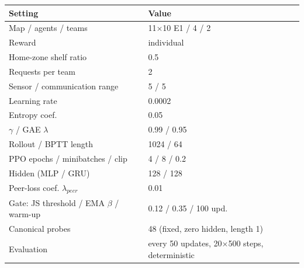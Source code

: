 \begin{tabular}{ll}
\toprule
Setting & Value \\
\midrule
Map / agents / teams & 11$\times$10 E1 / 4 / 2 \\
Reward & individual \\
Home-zone shelf ratio & 0.5 \\
Requests per team & 2 \\
Sensor / communication range & 5 / 5 \\
Learning rate & 0.0002 \\
Entropy coef. & 0.05 \\
$\gamma$ / GAE $\lambda$ & 0.99 / 0.95 \\
Rollout / BPTT length & 1024 / 64 \\
PPO epochs / minibatches / clip & 4 / 8 / 0.2 \\
Hidden (MLP / GRU) & 128 / 128 \\
Peer-loss coef. $\lambda_{peer}$ & 0.01 \\
Gate: JS threshold / EMA $\beta$ / warm-up & 0.12 / 0.35 / 100 upd. \\
Canonical probes & 48 (fixed, zero hidden, length 1) \\
Evaluation & every 50 updates, 20$\times$500 steps, deterministic \\
\bottomrule
\end{tabular}
